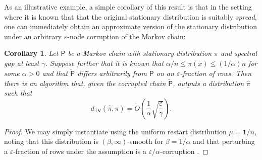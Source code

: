 \documentclass[11pt]{article}
\newtheorem{cor}[thm]{Corollary}
\theoremstyle{remark}
\begin{document}
As an illustrative example, a simple corollary of this result is that in the setting where it is known that that the original stationary distribution is suitably \emph{spread}, one can immediately obtain an approximate version of the stationary distribution under an arbitrary $\varepsilon$-node corruption of the Markov chain:

\begin{cor}
\label{cor:spread}
    Let $\mathsf{P}$ be a Markov chain with stationary distribution $\pi$ and spectral gap at least $\gamma$. Suppose further that it is known that $\alpha/n\leq \pi(x)\le (1/\alpha) n$ for some $\alpha>0$ and that $\widetilde{\mathsf{P}}$ differs arbitrarily from $\mathsf{P}$ on an $\varepsilon$-fraction of rows. Then there is an algorithm that, given the corrupted chain $\widetilde{\mathsf{P}}$, outputs a distribution $\widehat{\pi}$ such that
    \begin{equation*}
        d_{\mathsf{TV}}(\widehat{\pi},\pi)=\widetilde{O}\left(\frac{1}{\alpha}\sqrt{\frac{\varepsilon}{\gamma}}\right).
    \end{equation*}
\end{cor}
\begin{proof}
    We may simply instantiate  using the uniform restart distribution $\mu=\bm{1}/n$, noting that this distribution is $(\beta,\infty)$-smooth for $\beta=1/\alpha$ and that perturbing a $\varepsilon$-fraction of rows under the assumption is a $\varepsilon/\alpha$-corruption .
\end{proof}
\end{document}

